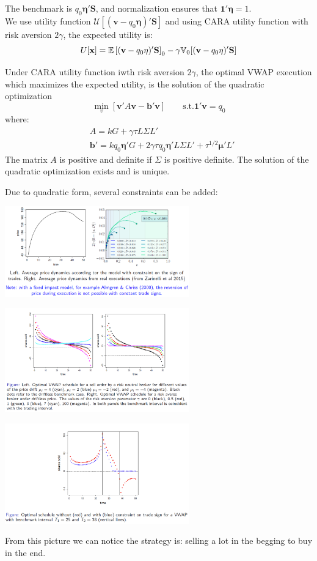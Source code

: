 The benchmark is $q_0\mathbf{\eta}'\mathbf{S}$, and normalization ensures that $\mathbf{1}'\mathbf{\eta} =1$.\\
We use utility function $\mathcal{U}[(\mathbf{v} - q_0 \mathbf{\eta})'\mathbf{S}]$ and using CARA utility function with risk aversion $2\gamma$, the expected utility is:
\[
U[\mathbf{x}] = \mathbb{E}\left[(\mathbf{v} -q_0\mathbf{\eta})'\mathbf{S}\right]_0 - \gamma \mathbb{V}_0[(\mathbf{v}-q_0\mathbf{\eta})'\mathbf{S}]
\]
\begin{mytheorem}
Under CARA utility function iwth risk aversion $2\gamma$, the optimal VWAP execution which maximizes the expected utility, is the solution of the quadratic optimization
\[
\min_{v}[\mathbf{v}'A\mathbf{v} - \mathbf{b}'\mathbf{v}] \qquad \text{s.t.} \mathbf{1}'\mathbf{v}=q_0
\]
where:
\begin{align}
&A =kG + \gamma \tau L \Sigma L'\\
&\mathbf{b}' = kq_0 \mathbf{\eta}'G + 2\gamma \tau q_0 \mathbf{\eta}'L\Sigma L' + \tau^{1/2} \mathbf{\mu}' L'
\end{align}
The matrix $A$ is positive and definite if $\Sigma$ is positive definite. The solution of the quadratic optimization exists and is unique.
\end{mytheorem}
Due to quadratic form, several constraints can be added:
\begin{center}
	\includegraphics[width=0.6\textwidth]{picture/(17)TIM_discrete_1.png}
\end{center}
\begin{center}
	\includegraphics[width=0.6\textwidth]{picture/(18)TIM_discrete_2.png}
\end{center}
\begin{center}
	\includegraphics[width=0.6\textwidth]{picture/(19)TIM_discrete_3.png}
\end{center}
From this picture we can notice the strategy is: selling a lot in the begging to buy in the end.
